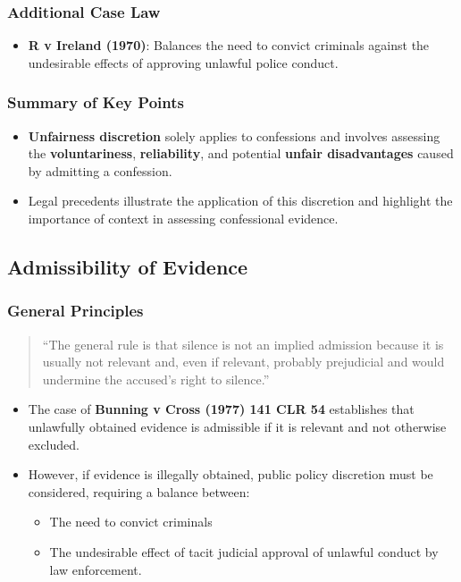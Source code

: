 \subsubsection{Additional Case Law}\label{additional-case-law}

\begin{itemize}
\tightlist
\item
  \textbf{R v Ireland (1970)}: Balances the need to convict criminals
  against the undesirable effects of approving unlawful police conduct.
\end{itemize}

\subsubsection{Summary of Key Points}\label{summary-of-key-points-1}

\begin{itemize}
\tightlist
\item
  \textbf{Unfairness discretion} solely applies to confessions and
  involves assessing the \textbf{voluntariness}, \textbf{reliability},
  and potential \textbf{unfair disadvantages} caused by admitting a
  confession.
\item
  Legal precedents illustrate the application of this discretion and
  highlight the importance of context in assessing confessional
  evidence.
\end{itemize}

\subsection{  Admissibility of
Evidence}\label{admissibility-of-evidence-4}

\subsubsection{General Principles}\label{general-principles-2}

\begin{quote}
``The general rule is that silence is not an implied admission because
it is usually not relevant and, even if relevant, probably prejudicial
and would undermine the accused's right to silence.''
\end{quote}

\begin{itemize}
\tightlist
\item
  The case of \textbf{Bunning v Cross (1977) 141 CLR 54} establishes
  that unlawfully obtained evidence is admissible if it is relevant and
  not otherwise excluded.
\item
  However, if evidence is illegally obtained, public policy discretion
  must be considered, requiring a balance between:

  \begin{itemize}
  \tightlist
  \item
    The need to convict criminals
  \item
    The undesirable effect of tacit judicial approval of unlawful
    conduct by law enforcement.
  \end{itemize}
\end{itemize}

